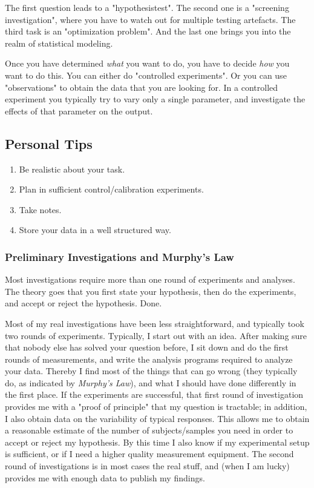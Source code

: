 The first question leads to a "\gls{hypothesistest}". The second one is a "screening investigation", where you have to watch out for multiple testing artefacts. The third task is an "optimization problem". And the last one brings you into the realm of statistical modeling.

Once you have determined \emph{what} you want to do, you have to decide \emph{how} you want to do this. You can either do "controlled experiments". Or you can use "observations" to obtain the data that you are looking for. In a controlled experiment you typically try to vary only a single parameter, and investigate the effects of that parameter on the output.

\subsection{Personal Tips}

\begin{enumerate}
  \item Be realistic about your task.
  \item Plan in sufficient control/calibration experiments.
  \item Take notes.
  \item Store your data in a well structured way.
\end{enumerate}

\subsubsection{Preliminary Investigations and Murphy's Law}
Most investigations require more than one round of experiments and analyses. The theory goes that you first state your hypothesis, then do the experiments, and accept or reject the hypothesis. Done.

Most of my real investigations have been less straightforward, and typically took two rounds of experiments. Typically, I start out with an idea. After making sure that nobody else has solved your question before, I sit down and do the first rounds of measurements, and write the analysis programs required to analyze your data. Thereby I find most of the things that can go wrong (they typically do, as indicated by \emph{Murphy's Law}), and what I should have done differently in the first place. If the experiments are successful, that first round of investigation provides me with a "proof of principle" that my question is tractable; in addition, I also obtain data on the variability of typical responses. This allows me to obtain a reasonable estimate of the number of subjects/samples you need in order to accept or reject my hypothesis. By this time I also know if my experimental setup is sufficient, or if I need a higher quality measurement equipment. The second round of investigations is in most cases the real stuff, and (when I am lucky) provides me with enough data to publish my findings.

